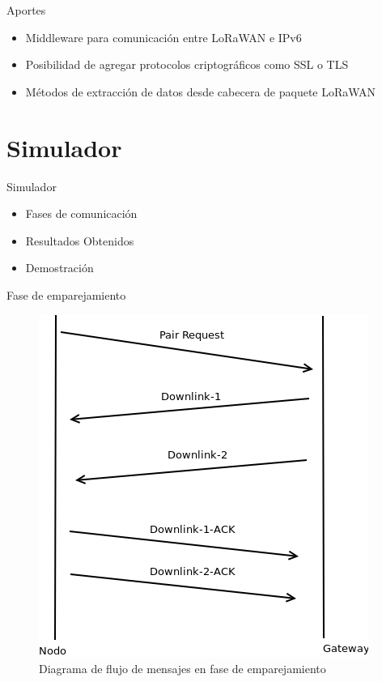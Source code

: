 \documentclass[10pt]{beamer}
\begin{document}
\begin{frame}[fragile]{Aportes}
\begin{itemize}
\item Middleware para comunicación entre LoRaWAN e IPv6
\item Posibilidad de agregar protocolos criptográficos como SSL o TLS
\item Métodos de extracción de datos desde cabecera de paquete LoRaWAN
\end{itemize}
\end{frame}
\section{Simulador}

\begin{frame}[fragile]{Simulador}
\begin{itemize}
\item Fases de comunicación
\item Resultados Obtenidos
\item Demostración
\end{itemize}
\end{frame}

\begin{frame}[fragile]{Fase de emparejamiento}
\begin{figure}
\centering\includegraphics[scale=0.37]{imagenes/pair}\caption{Diagrama de flujo de mensajes en fase de emparejamiento}
\end{figure}
\end{frame}
\end{document}
